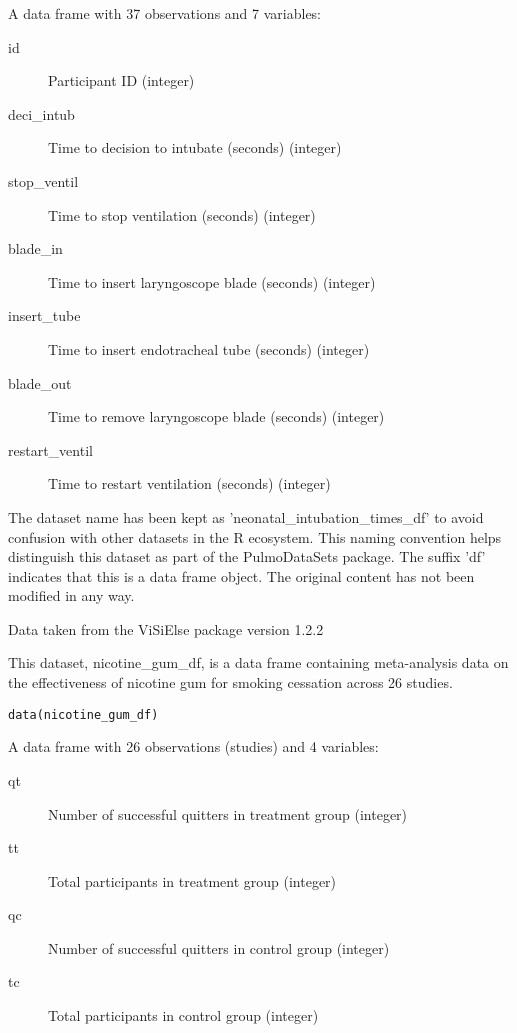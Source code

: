\documentclass[a4paper]{book}
\begin{document}
%
\begin{Format}
A data frame with 37 observations and 7 variables:
\begin{description}

\item[id] Participant ID (integer)
\item[deci\_intub] Time to decision to intubate (seconds) (integer)
\item[stop\_ventil] Time to stop ventilation (seconds) (integer)
\item[blade\_in] Time to insert laryngoscope blade (seconds) (integer)
\item[insert\_tube] Time to insert endotracheal tube (seconds) (integer)
\item[blade\_out] Time to remove laryngoscope blade (seconds) (integer)
\item[restart\_ventil] Time to restart ventilation (seconds) (integer)

\end{description}

\end{Format}
%
\begin{Details}
The dataset name has been kept as 'neonatal\_intubation\_times\_df' to avoid confusion
with other datasets in the R ecosystem. This naming convention helps distinguish
this dataset as part of the PulmoDataSets package. The suffix 'df' indicates
that this is a data frame object. The original content has not been modified
in any way.
\end{Details}
%
\begin{Source}
Data taken from the ViSiElse package version 1.2.2
\end{Source}
%
\begin{Description}
This dataset, nicotine\_gum\_df, is a data frame containing meta-analysis data
on the effectiveness of nicotine gum for smoking cessation across 26 studies.
\end{Description}
%
\begin{Usage}
\begin{verbatim}
data(nicotine_gum_df)
\end{verbatim}
\end{Usage}
%
\begin{Format}
A data frame with 26 observations (studies) and 4 variables:
\begin{description}

\item[qt] Number of successful quitters in treatment group (integer)
\item[tt] Total participants in treatment group (integer)
\item[qc] Number of successful quitters in control group (integer)
\item[tc] Total participants in control group (integer)

\end{description}

\end{Format}
\end{document}
